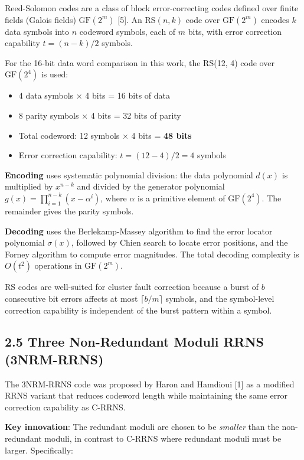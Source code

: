 Reed-Solomon codes are a class of block error-correcting codes defined
over finite fields (Galois fields) \(\text{GF}(2^m)\) {[}5{]}. An
RS\((n, k)\) code over \(\text{GF}(2^m)\) encodes \(k\) data symbols
into \(n\) codeword symbols, each of \(m\) bits, with error correction
capability \(t = (n-k)/2\) symbols.

For the 16-bit data word comparison in this work, the RS(12, 4) code
over \(\text{GF}(2^4)\) is used:

\begin{itemize}
\tightlist
\item
  4 data symbols × 4 bits = 16 bits of data
\item
  8 parity symbols × 4 bits = 32 bits of parity
\item
  Total codeword: 12 symbols × 4 bits = \textbf{48 bits}
\item
  Error correction capability: \(t = (12-4)/2 = 4\) symbols
\end{itemize}

\textbf{Encoding} uses systematic polynomial division: the data
polynomial \(d(x)\) is multiplied by \(x^{n-k}\) and divided by the
generator polynomial \(g(x) = \prod_{i=1}^{n-k}(x - \alpha^i)\), where
\(\alpha\) is a primitive element of \(\text{GF}(2^4)\). The remainder
gives the parity symbols.

\textbf{Decoding} uses the Berlekamp-Massey algorithm to find the error
locator polynomial \(\sigma(x)\), followed by Chien search to locate
error positions, and the Forney algorithm to compute error magnitudes.
The total decoding complexity is \(O(t^2)\) operations in
\(\text{GF}(2^m)\).

RS codes are well-suited for cluster fault correction because a burst of
\(b\) consecutive bit errors affects at most \(\lceil b/m \rceil\)
symbols, and the symbol-level correction capability is independent of
the burst pattern within a symbol.

\subsection{2.5 Three Non-Redundant Moduli RRNS
(3NRM-RRNS)}\label{three-non-redundant-moduli-rrns-3nrm-rrns}

The 3NRM-RRNS code was proposed by Haron and Hamdioui {[}1{]} as a
modified RRNS variant that reduces codeword length while maintaining the
same error correction capability as C-RRNS.

\textbf{Key innovation}: The redundant moduli are chosen to be
\emph{smaller} than the non-redundant moduli, in contrast to C-RRNS
where redundant moduli must be larger. Specifically:

